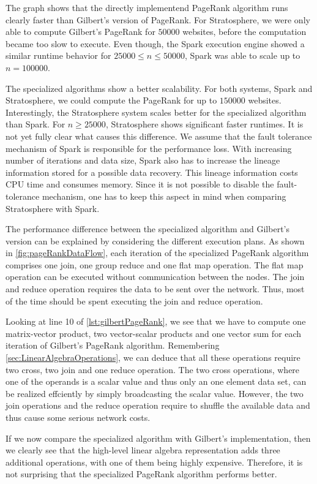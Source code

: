 The graph shows that the directly implementend PageRank algorithm runs clearly faster than Gilbert's version of PageRank.
For Stratosphere, we were only able to compute Gilbert's PageRank for $50000$ websites, before the computation became too slow to execute.
Even though, the Spark execution engine showed a similar runtime behavior for $25000 \le n \le 50000$, Spark was able to scale up to $n=100000$.

The specialized algorithms show a better scalability.
For both systems, Spark and Stratosphere, we could compute the PageRank for up to $150000$ websites.
Interestingly, the Stratosphere system scales better for the specialized algorithm than Spark.
For $n\ge 25000$, Stratosphere shows significant faster runtimes.
It is not yet fully clear what causes this difference.
We assume that the fault tolerance mechanism of Spark is responsible for the performance loss.
With increasing number of iterations and data size, Spark also has to increase the lineage information stored for a possible data recovery.
This lineage information costs CPU time and consumes memory.
Since it is not possible to disable the fault-tolerance mechanism, one has to keep this aspect in mind when comparing Stratosphere with Spark.

The performance difference between the specialized algorithm and Gilbert's version can be explained by considering the different execution plans.
As shown in \cref{fig:pageRankDataFlow}, each iteration of the specialized PageRank algorithm comprises one join, one group reduce and one flat map operation.
The flat map operation can be executed without communication between the nodes.
The join and reduce operation requires the data to be sent over the network.
Thus, most of the time should be spent executing the join and reduce operation.

Looking at line 10 of \cref{lst:gilbertPageRank}, we see that we have to compute one matrix-vector product, two vector-scalar products and one vector sum for each iteration of Gilbert's PageRank algorithm.
Remembering \cref{sec:LinearAlgebraOperations}, we can deduce that all these operations require two cross, two join and one reduce operation.
The two cross operations, where one of the operands is a scalar value and thus only an one element data set, can be realized effciently by simply broadcasting the scalar value.
However, the two join operations and the reduce operation require to shuffle the available data and thus cause some serious network costs.

If we now compare the specialized algorithm with Gilbert's implementation, then we clearly see that the high-level linear algebra representation adds three additional operations, with one of them being highly expensive.
Therefore, it is not surprising that the specialized PageRank algorithm performs better.


